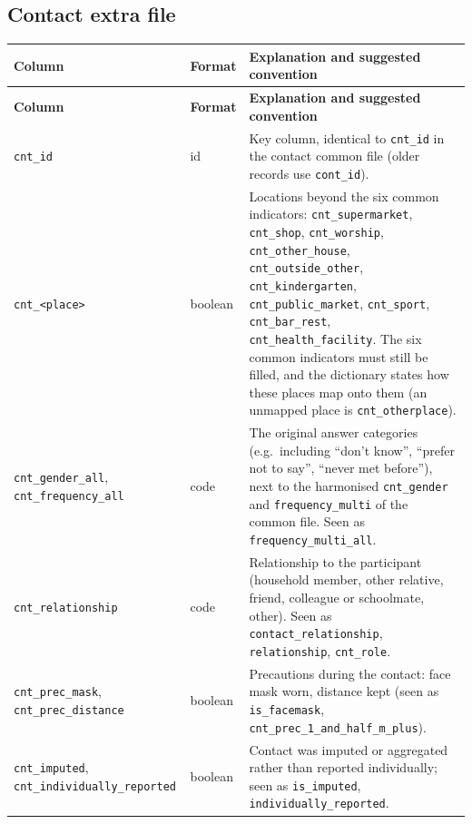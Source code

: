 \documentclass[11pt,a4paper]{article}
\begin{document}
\subsection*{Contact extra file}
{\footnotesize
\begin{longtable}{p{3.4cm} p{1.8cm} p{8.2cm}}
\toprule
\textbf{Column} & \textbf{Format} & \textbf{Explanation and suggested convention} \\
\midrule
\endfirsthead
\toprule
\textbf{Column} & \textbf{Format} & \textbf{Explanation and suggested convention} \\
\midrule
\endhead
\bottomrule
\endfoot
    \texttt{cnt\_\allowbreak{}id} & id & Key column, identical to \texttt{cnt\_\allowbreak{}id} in the contact common file (older records use \texttt{cont\_\allowbreak{}id}). \\
    \texttt{cnt\_\allowbreak{}<place>} & boolean & Locations beyond the six common indicators: \texttt{cnt\_\allowbreak{}supermarket}, \texttt{cnt\_\allowbreak{}shop}, \texttt{cnt\_\allowbreak{}worship}, \texttt{cnt\_\allowbreak{}other\_\allowbreak{}house}, \texttt{cnt\_\allowbreak{}outside\_\allowbreak{}other}, \texttt{cnt\_\allowbreak{}kindergarten}, \texttt{cnt\_\allowbreak{}public\_\allowbreak{}market}, \texttt{cnt\_\allowbreak{}sport}, \texttt{cnt\_\allowbreak{}bar\_\allowbreak{}rest}, \texttt{cnt\_\allowbreak{}health\_\allowbreak{}facility}. The six common indicators must still be filled, and the dictionary states how these places map onto them (an unmapped place is \texttt{cnt\_\allowbreak{}otherplace}). \\
    \texttt{cnt\_\allowbreak{}gender\_\allowbreak{}all}, \texttt{cnt\_\allowbreak{}frequency\_\allowbreak{}all} & code & The original answer categories (e.g.\ including ``don't know'', ``prefer not to say'', ``never met before''), next to the harmonised \texttt{cnt\_\allowbreak{}gender} and \texttt{frequency\_\allowbreak{}multi} of the common file. Seen as \texttt{frequency\_\allowbreak{}multi\_\allowbreak{}all}. \\
    \texttt{cnt\_\allowbreak{}relationship} & code & Relationship to the participant (household member, other relative, friend, colleague or schoolmate, other). Seen as \texttt{contact\_\allowbreak{}relationship}, \texttt{relationship}, \texttt{cnt\_\allowbreak{}role}. \\
    \texttt{cnt\_\allowbreak{}prec\_\allowbreak{}mask}, \texttt{cnt\_\allowbreak{}prec\_\allowbreak{}distance} & boolean & Precautions during the contact: face mask worn, distance kept (seen as \texttt{is\_\allowbreak{}facemask}, \texttt{cnt\_\allowbreak{}prec\_\allowbreak{}1\_\allowbreak{}and\_\allowbreak{}half\_\allowbreak{}m\_\allowbreak{}plus}). \\
    \texttt{cnt\_\allowbreak{}imputed}, \texttt{cnt\_\allowbreak{}individually\_\allowbreak{}reported} & boolean & Contact was imputed or aggregated rather than reported individually; seen as \texttt{is\_\allowbreak{}imputed}, \texttt{individually\_\allowbreak{}reported}. \\
\end{longtable}
}
\end{document}
